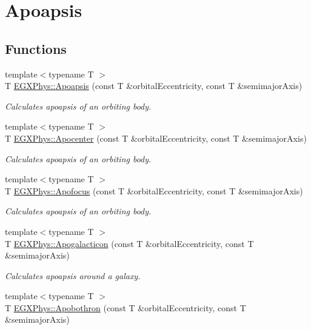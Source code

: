 \hypertarget{group___apoapsis}{}\section{Apoapsis}
\label{group___apoapsis}
\subsection*{Functions}
\begin{DoxyCompactItemize}
\item 
{\footnotesize template$<$typename T $>$ }\\T \hyperlink{group___apoapsis_gaf962e650bf84a568458e8eb39b1c61ba}{E\+G\+X\+Phys\+::\+Apoapsis} (const T \&orbital\+Eccentricity, const T \&semimajor\+Axis)
\begin{DoxyCompactList}\small\item\em Calculates apoapsis of an orbiting body. \end{DoxyCompactList}\item 
{\footnotesize template$<$typename T $>$ }\\T \hyperlink{group___apoapsis_ga5e51a53e2f974264bada34f159fdc948}{E\+G\+X\+Phys\+::\+Apocenter} (const T \&orbital\+Eccentricity, const T \&semimajor\+Axis)
\begin{DoxyCompactList}\small\item\em Calculates apoapsis of an orbiting body. \end{DoxyCompactList}\item 
{\footnotesize template$<$typename T $>$ }\\T \hyperlink{group___apoapsis_gaa53ac4e15bc6bc0fecf72eadb7a513e0}{E\+G\+X\+Phys\+::\+Apofocus} (const T \&orbital\+Eccentricity, const T \&semimajor\+Axis)
\begin{DoxyCompactList}\small\item\em Calculates apoapsis of an orbiting body. \end{DoxyCompactList}\item 
{\footnotesize template$<$typename T $>$ }\\T \hyperlink{group___apoapsis_ga09b4c7d5e971dc28e1ba37f479958c27}{E\+G\+X\+Phys\+::\+Apogalacticon} (const T \&orbital\+Eccentricity, const T \&semimajor\+Axis)
\begin{DoxyCompactList}\small\item\em Calculates apoapsis around a galaxy. \end{DoxyCompactList}\item 
{\footnotesize template$<$typename T $>$ }\\T \hyperlink{group___apoapsis_ga6fe084b9e69f47a5032b05aa8f6bf7ad}{E\+G\+X\+Phys\+::\+Apobothron} (const T \&orbital\+Eccentricity, const T \&semimajor\+Axis)

\end{DoxyCompactItemize}

